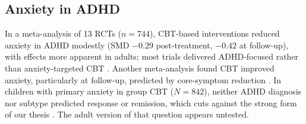 \subsection{Anxiety in ADHD}
In a meta-analysis of 13 RCTs ($n=744$), CBT-based interventions reduced anxiety in ADHD modestly (SMD $-0.29$ post-treatment, $-0.42$ at follow-up), with effects more apparent in adults; most trials delivered ADHD-focused rather than anxiety-targeted CBT \citep{wang2026cbtanxiety}. Another meta-analysis found CBT improved anxiety, particularly at follow-up, predicted by core-symptom reduction \citep{lopezpinar2020internalizing}. In children with primary anxiety in group CBT ($N=842$), neither ADHD diagnosis nor subtype predicted response or remission, which cuts against the strong form of our thesis \citep{gould2018cbtanxiety}. The adult version of that question appears untested.
